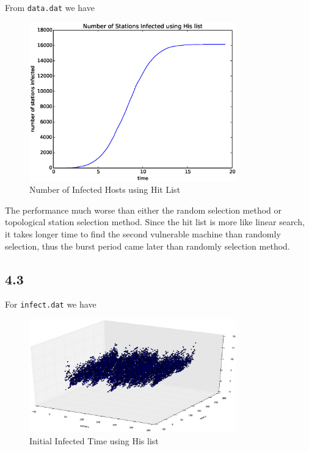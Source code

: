 \documentclass[10pt]{article}
\begin{document}
From \texttt{data.dat} we have
\begin{figure}[H]
\begin{center}
\includegraphics[width=0.8\textwidth]{figure4.2.eps}
\caption{Number of Infected Hosts using Hit List}
\end{center}
\end{figure}

The performance much worse than either the random selection method or topological station selection method. Since the hit list is more like linear search, it takes longer time to find the second vulnerable machine than randomly selection, thus the burst period came later than randomly selection method.

\subsection*{4.3}
For \texttt{infect.dat} we have

\begin{figure}[H]
\begin{center}
\includegraphics[width=0.8\textwidth]{figure4.3.eps}
\caption{Initial Infected Time using His list}
\end{center}
\end{figure}
\end{document}
